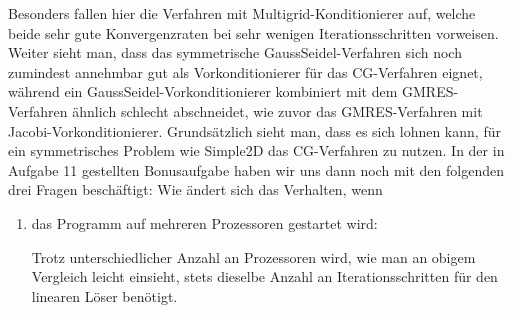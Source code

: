 \documentclass[12pt,a4paper]{scrartcl}
\numberwithin{equation}{section}
\begin{document}
Besonders fallen hier die Verfahren mit Multigrid-Konditionierer auf, welche beide sehr gute Konvergenzraten bei sehr wenigen Iterationsschritten vorweisen.
Weiter sieht man, dass das symmetrische GaussSeidel-Verfahren sich noch zumindest annehmbar gut als Vorkonditionierer für das CG-Verfahren eignet, während ein GaussSeidel-Vorkonditionierer kombiniert mit dem GMRES-Verfahren ähnlich schlecht abschneidet, wie zuvor das GMRES-Verfahren mit Jacobi-Vorkonditionierer.
Grundsätzlich sieht man, dass es  sich lohnen kann, für ein symmetrisches Problem wie Simple2D das CG-Verfahren zu nutzen.
\newline
In der in Aufgabe 11 gestellten Bonusaufgabe haben wir uns dann noch mit den folgenden drei Fragen beschäftigt: Wie ändert sich das Verhalten, wenn 
\begin{enumerate}
	\item das Programm auf mehreren Prozessoren gestartet wird:
	\begin{figure}[H]
		\centering
	\end{figure}
    
    Trotz unterschiedlicher Anzahl an Prozessoren wird, wie man an obigem Vergleich leicht einsieht, stets dieselbe Anzahl an Iterationsschritten für den linearen Löser benötigt.
    


\end{enumerate}
\end{document}
